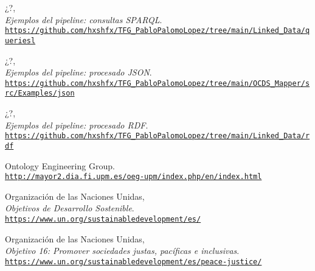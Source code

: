 \begin{thebibliography}{X}
            ¿?,
            \\ \textit{Ejemplos del pipeline: consultas SPARQL}.
            \\ \texttt{\url{https://github.com/hxshfx/TFG_PabloPalomoLopez/tree/main/Linked_Data/queriesl}}
            
            ¿?,
            \\ \textit{Ejemplos del pipeline: procesado JSON}.
            \\ \texttt{\url{https://github.com/hxshfx/TFG_PabloPalomoLopez/tree/main/OCDS_Mapper/src/Examples/json}}
            
            ¿?,
            \\ \textit{Ejemplos del pipeline: procesado RDF}.
            \\ \texttt{\url{https://github.com/hxshfx/TFG_PabloPalomoLopez/tree/main/Linked_Data/rdf}}
            
            Ontology Engineering Group.
            \\ \texttt{\url{http://mayor2.dia.fi.upm.es/oeg-upm/index.php/en/index.html}}
            
            Organización de las Naciones Unidas,
            \\ \textit{Objetivos de Desarrollo Sostenible}.
            \\ \texttt{\url{https://www.un.org/sustainabledevelopment/es/}}
            
            Organización de las Naciones Unidas,
            \\ \textit{Objetivo 16: Promover sociedades justas, pacíficas e inclusivas}.
            \\ \texttt{\url{https://www.un.org/sustainabledevelopment/es/peace-justice/}}
        
    \end{thebibliography}
\endgroup

\newpage